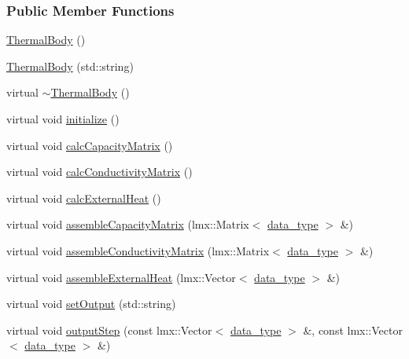 \subsubsection*{Public Member Functions}
\begin{DoxyCompactItemize}
\item 
\hyperlink{classmknix_1_1_thermal_body_a41c675feaab004c04ff4f5ae0fb8a27e}{Thermal\-Body} ()
\item 
\hyperlink{classmknix_1_1_thermal_body_ac80f8070e47d8467ff2818a9d9095a8c}{Thermal\-Body} (std\-::string)
\item 
virtual \hyperlink{classmknix_1_1_thermal_body_a5d4980cc538507f1f10111de9eca4018}{$\sim$\-Thermal\-Body} ()
\item 
virtual void \hyperlink{classmknix_1_1_thermal_body_a091d281dcf4425296ea643e0f338ae83}{initialize} ()
\item 
virtual void \hyperlink{classmknix_1_1_thermal_body_a9908d53e5af15285c2fdd1d909779a81}{calc\-Capacity\-Matrix} ()
\item 
virtual void \hyperlink{classmknix_1_1_thermal_body_ad5b8eca1b13f081a5b49b2fa87c6be73}{calc\-Conductivity\-Matrix} ()
\item 
virtual void \hyperlink{classmknix_1_1_thermal_body_a70ef05491f16086ff69788f745006a88}{calc\-External\-Heat} ()
\item 
virtual void \hyperlink{classmknix_1_1_thermal_body_a924ad06260f3ab9c181fd6149425bc6f}{assemble\-Capacity\-Matrix} (lmx\-::\-Matrix$<$ \hyperlink{namespacemknix_a16be4b246fbf2cceb141e3a179111020}{data\-\_\-type} $>$ \&)
\item 
virtual void \hyperlink{classmknix_1_1_thermal_body_a205d5c7c2c3b96577bb8d539ba3931f6}{assemble\-Conductivity\-Matrix} (lmx\-::\-Matrix$<$ \hyperlink{namespacemknix_a16be4b246fbf2cceb141e3a179111020}{data\-\_\-type} $>$ \&)
\item 
virtual void \hyperlink{classmknix_1_1_thermal_body_a32328eca2fc0240ae2735bf402b3bdb8}{assemble\-External\-Heat} (lmx\-::\-Vector$<$ \hyperlink{namespacemknix_a16be4b246fbf2cceb141e3a179111020}{data\-\_\-type} $>$ \&)
\item 
virtual void \hyperlink{classmknix_1_1_thermal_body_a1b40d106be9463126117d455fb508f86}{set\-Output} (std\-::string)
\item 
virtual void \hyperlink{classmknix_1_1_thermal_body_afb78089ba843d2496cce134429cbd659}{output\-Step} (const lmx\-::\-Vector$<$ \hyperlink{namespacemknix_a16be4b246fbf2cceb141e3a179111020}{data\-\_\-type} $>$ \&, const lmx\-::\-Vector$<$ \hyperlink{namespacemknix_a16be4b246fbf2cceb141e3a179111020}{data\-\_\-type} $>$ \&)

\end{DoxyCompactItemize}
